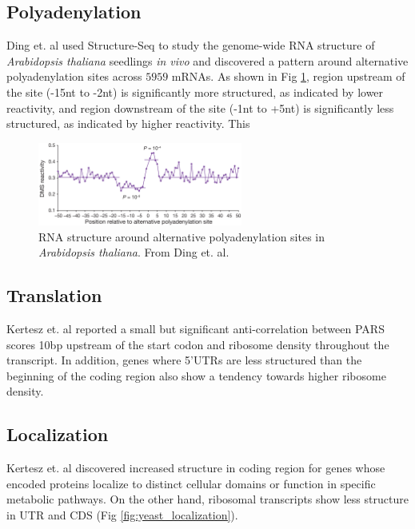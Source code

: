 \documentclass{proposal}
\begin{document}
\subsection*{Polyadenylation}

Ding et. al\cite{ding2014vivo} used Structure-Seq to study the genome-wide RNA structure of
﻿\textit{Arabidopsis thaliana} seedlings \textit{in vivo} and discovered a pattern around alternative polyadenylation sites across $5959$ mRNAs.
As shown in Fig \ref{fig:poly_a}, region upstream of the site (-15nt to -2nt) is significantly more structured, as indicated by lower reactivity,
and region downstream of the site (-1nt to +5nt) is significantly less structured, as indicated by higher reactivity.
This

\begin{figure}[h!]
    \centering
    \includegraphics[width=0.6\textwidth]{poly_a.png}
    \caption{RNA structure around alternative polyadenylation sites in ﻿\textit{Arabidopsis thaliana}. From Ding et. al\cite{ding2014vivo}.}
    \label{fig:poly_a}
    \centering
\end{figure}





\subsection*{Translation}

Kertesz et. al\cite{kertesz2010genome} reported a small but significant anti-correlation between PARS scores 10bp upstream
of the start codon and ribosome density throughout the transcript.
In addition, genes where 5'UTRs are less structured than the beginning of the coding region also show a tendency towards higher ribosome density.

\subsection*{Localization}

Kertesz et. al\cite{kertesz2010genome} discovered increased structure in coding region for genes
whose encoded proteins localize to distinct cellular domains or function in specific metabolic pathways.
On the other hand, ribosomal transcripts show less structure in UTR and CDS (Fig \ref{fig:yeast_localization}).
\end{document}
